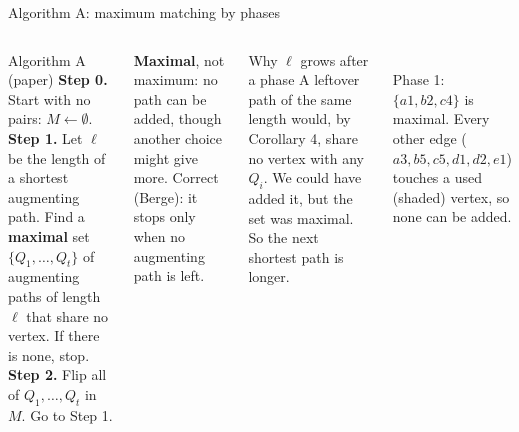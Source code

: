\documentclass[aspectratio=169,11pt]{beamer}
\begin{document}
\begin{frame}{Algorithm A: maximum matching by phases}
\begin{columns}[T]
\begin{block}{Algorithm A (paper)}
\footnotesize
\textbf{Step 0.} Start with no pairs: $M\gets\emptyset$.\\
\textbf{Step 1.} Let $\ell$ be the length of a shortest augmenting path. Find a \textbf{maximal} set $\{Q_1,\dots,Q_t\}$ of augmenting paths of length $\ell$ that share no vertex. If there is none, stop.\\
\textbf{Step 2.} Flip all of $Q_1,\dots,Q_t$ in $M$. Go to Step 1.
\end{block}
\footnotesize
\textbf{Maximal}, not maximum: no path can be added, though another choice might give more. Correct (Berge): it stops only when no augmenting path is left.\par\vspace{1mm}
\begin{alertblock}{Why $\ell$ grows after a phase}
\footnotesize A leftover path of the same length would, by Corollary 4, share no vertex with any $Q_i$. We could have added it, but the set was maximal. So the next shortest path is longer.
\end{alertblock}
\centering
{}\\[0mm]
{\scriptsize Phase 1: $\{a1,b2,c4\}$ is maximal. Every other edge ($a3,b5,c5,d1,d2,e1$) touches a used (shaded) vertex, so none can be added.}
\end{columns}
\end{frame}
\end{document}
